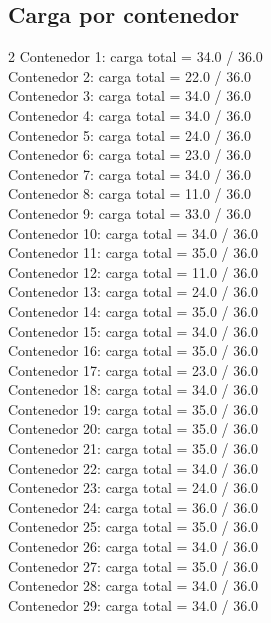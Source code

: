 \subsection*{Carga por contenedor}
\begin{multicols}{2}
\scriptsize
\noindent
Contenedor 1: carga total = 34.0 / 36.0\\
Contenedor 2: carga total = 22.0 / 36.0\\
Contenedor 3: carga total = 34.0 / 36.0\\
Contenedor 4: carga total = 34.0 / 36.0\\
Contenedor 5: carga total = 24.0 / 36.0\\
Contenedor 6: carga total = 23.0 / 36.0\\
Contenedor 7: carga total = 34.0 / 36.0\\
Contenedor 8: carga total = 11.0 / 36.0\\
Contenedor 9: carga total = 33.0 / 36.0\\
Contenedor 10: carga total = 34.0 / 36.0\\
Contenedor 11: carga total = 35.0 / 36.0\\
Contenedor 12: carga total = 11.0 / 36.0\\
Contenedor 13: carga total = 24.0 / 36.0\\
Contenedor 14: carga total = 35.0 / 36.0\\
Contenedor 15: carga total = 34.0 / 36.0\\
Contenedor 16: carga total = 35.0 / 36.0\\
Contenedor 17: carga total = 23.0 / 36.0\\
Contenedor 18: carga total = 34.0 / 36.0\\
Contenedor 19: carga total = 35.0 / 36.0\\
Contenedor 20: carga total = 35.0 / 36.0\\
Contenedor 21: carga total = 35.0 / 36.0\\
Contenedor 22: carga total = 34.0 / 36.0\\
Contenedor 23: carga total = 24.0 / 36.0\\
Contenedor 24: carga total = 36.0 / 36.0\\
Contenedor 25: carga total = 35.0 / 36.0\\
Contenedor 26: carga total = 34.0 / 36.0\\
Contenedor 27: carga total = 35.0 / 36.0\\
Contenedor 28: carga total = 34.0 / 36.0\\
Contenedor 29: carga total = 34.0 / 36.0\\

\end{multicols}
